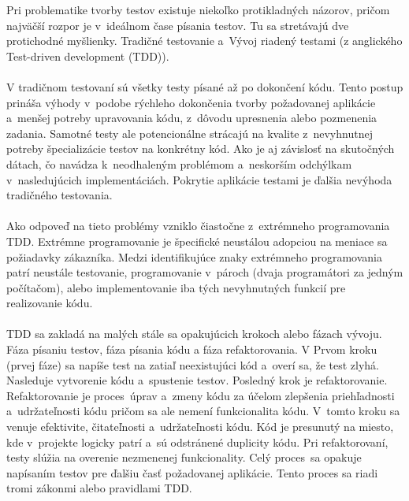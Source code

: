 \documentclass[
  digital, %
  table,   %
oneside,
  nolof,     %
  nolot,     %
]{fithesis3}
\begin{document}
Pri problematike tvorby testov existuje niekoľko protikladných názorov, pričom najväčší rozpor je v~ideálnom čase písania testov. Tu sa stretávajú dve protichodné myšlienky. Tradičné testovanie a~Vývoj riadený testami (z anglického  Test-driven development (TDD))\cite{softwareTesting}. \paragraph{}
V tradičnom testovaní sú všetky testy písané až po dokončení kódu. Tento postup prináša výhody v~podobe rýchleho dokončenia tvorby požadovanej aplikácie a~menšej potreby upravovania kódu, z~dôvodu upresnenia alebo pozmenenia zadania. Samotné testy ale potencionálne strácajú na kvalite z~nevyhnutnej  potreby špecializácie testov na konkrétny kód. Ako je aj závislosť na skutočných dátach, čo navádza k~neodhaleným problémom a~neskorším odchýlkam v~nasledujúcich implementáciách. Pokrytie aplikácie testami je ďalšia nevýhoda tradičného testovania.  \paragraph{}
Ako odpoveď na tieto problémy vzniklo čiastočne z~extrémneho programovania TDD. Extrémne programovanie je špecifické neustálou adopciou na meniace sa požiadavky zákazníka. Medzi identifikujúce znaky extrémneho programovania patrí neustále testovanie, programovanie v~pároch (dvaja programátori za jedným počítačom), alebo implementovanie  iba tých nevyhnutných funkcií pre realizovanie kódu. \paragraph{}
TDD sa zakladá na malých stále sa opakujúcich krokoch alebo fázach vývoju. Fáza písaniu testov, fáza písania kódu a fáza refaktorovania.
V Prvom kroku (prvej fáze) sa napíše test na zatiaľ neexistujúci kód a~overí sa, že test zlyhá. Nasleduje vytvorenie kódu a~spustenie testov. Posledný krok je refaktorovanie. Refaktorovanie je proces~úprav a~zmeny kódu za účelom zlepšenia priehľadnosti a~udržateľnosti kódu pričom sa ale nemení funkcionalita kódu. V~tomto kroku sa venuje efektivite, čitateľnosti a~udržateľnosti kódu. Kód je presunutý na miesto, kde v~projekte logicky patrí a~sú odstránené duplicity kódu. Pri refaktorovaní, testy slúžia na overenie nezmenenej funkcionality. Celý proces~sa opakuje napísaním testov pre ďalšiu časť požadovanej aplikácie.
Tento proces sa riadi tromi zákonmi alebo pravidlami TDD.  \cite{The Three Laws of TDD (Clean Code: A Handbook of Agile Software Craftsmanship by Robert C. Martin p.122).}
\end{document}
